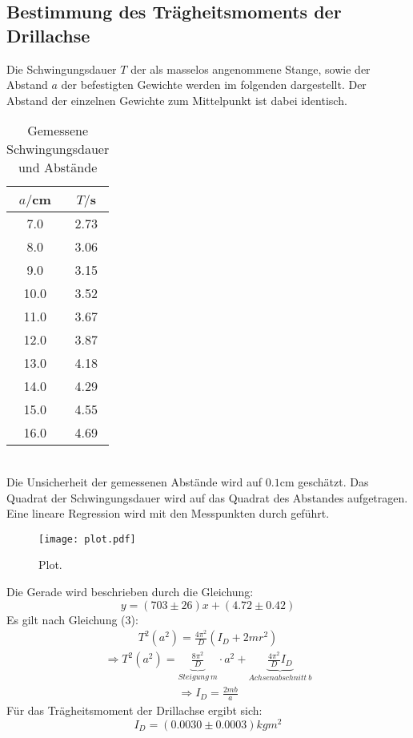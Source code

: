 \subsection{Bestimmung des Trägheitsmoments der Drillachse}
Die Schwingungsdauer $T$ der als masselos angenommene Stange, sowie der Abstand $a$
der befestigten Gewichte werden im folgenden dargestellt. Der Abstand der einzelnen
Gewichte zum Mittelpunkt ist dabei identisch.
\begin{table}
  \centering
  \caption{Gemessene Schwingungsdauer und Abstände}
  \label{tab:Gemessene Schwingungsdauer und Abstände}
  \begin{tabular}{c c}
    \toprule
    $a/$cm & $T/$s \\
    \midrule
     7.0 & 2.73 \\
     8.0 & 3.06 \\
     9.0 & 3.15 \\
    10.0 & 3.52 \\
    11.0 & 3.67 \\
    12.0 & 3.87 \\
    13.0 & 4.18 \\
    14.0 & 4.29 \\
    15.0 & 4.55 \\
    16.0 & 4.69 \\
    \bottomrule
  \end{tabular}
\end{table} \\

Die Unsicherheit der gemessenen Abstände wird auf $0.1$cm geschätzt.
Das Quadrat der Schwingungsdauer wird auf das Quadrat des Abstandes
aufgetragen. Eine lineare Regression wird mit den Messpunkten durch geführt.

\begin{figure}
  \centering
  \texttt{[image: plot.pdf]}
  \caption{Plot.}
  \label{fig:plot}
\end{figure}

Die Gerade wird beschrieben durch die Gleichung:
\begin{equation}
  y = (703 \pm 26)x + (4.72 \pm 0.42)
\end{equation}
Es gilt nach Gleichung (3):
\begin{align}
  T^2(a^2) = \frac{4\pi^2}{D}(I_D + 2mr^2)
\end{align}
\begin{align}
  \Rightarrow T^2(a^2) = \underbrace{\frac{8\pi^2}{D}}_{Steigung \: m} \cdot a^2 + \underbrace{\frac{4\pi^2}{D}I_D}_{Achsenabschnitt \: b}
\end{align}
\begin{align}
  \Rightarrow I_D = \frac{2mb}{a}
\end{align}
Für das Trägheitsmoment der Drillachse ergibt sich:
\begin{equation}
  I_D = (0.0030 \pm 0.0003) kgm^2
\end{equation}

